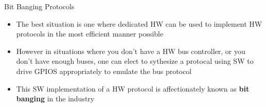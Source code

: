 \begin{frame}
   {Bit Banging Protocols}
   \begin{itemize}
      \item The best situation is one where dedicated HW can be used to implement
	      HW protocols in the most efficient manner possible
      \item However in situations where you don't have a HW bus controller, or you
	      don't have enough buses, one can elect to sythesize a protocal
              using SW to drive GPIOS appropriately to emulate the bus protocol
      \item This SW implementation of a HW protocol is affectionately known as
	      \textbf{bit banging} in the industry
   \end{itemize}
\end{frame}

\cprotect\note{


}

